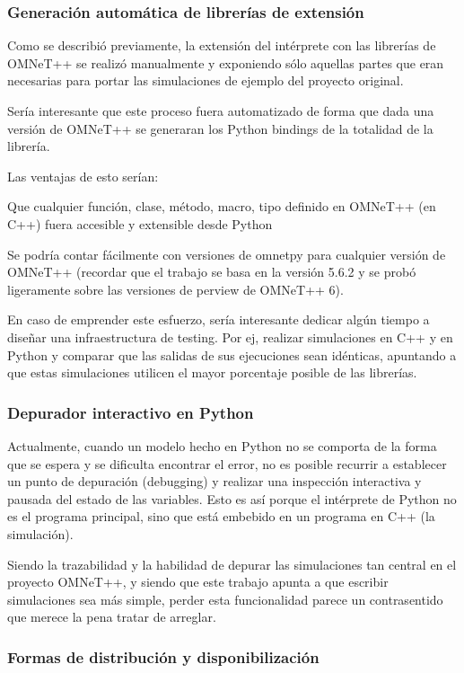 \documentclass[]{article}
\begin{document}
\subsubsection{Generación automática de librerías de extensión}

Como se describió previamente, la extensión del intérprete con las librerías de
OMNeT++ se realizó manualmente y exponiendo sólo aquellas partes que eran
necesarias para portar las simulaciones de ejemplo del proyecto original.

Sería interesante que este proceso fuera automatizado de forma que dada una
versión de OMNeT++ se generaran los Python bindings de la totalidad de la
librería.

Las ventajas de esto serían:

Que cualquier función, clase, método, macro, tipo definido en OMNeT++ (en C++)
fuera accesible y extensible desde Python

Se podría contar fácilmente con versiones de omnetpy para cualquier versión de
OMNeT++ (recordar que el trabajo se basa en la versión 5.6.2 y se probó
ligeramente sobre las versiones de perview de OMNeT++ 6).

En caso de emprender este esfuerzo, sería interesante dedicar algún tiempo a
diseñar una infraestructura de testing. Por ej, realizar simulaciones en C++ y
en Python y comparar que las salidas de sus ejecuciones sean idénticas,
apuntando a que estas simulaciones utilicen el mayor porcentaje posible de las
librerías.

\subsubsection{Depurador interactivo en Python}

Actualmente, cuando un modelo hecho en Python no se comporta de la forma que se
espera y se dificulta encontrar el error, no es posible recurrir a establecer
un punto de depuración (debugging) y realizar una inspección interactiva y
pausada del estado de las variables. Esto es así porque el intérprete de Python
no es el programa principal, sino que está embebido en un programa en C++ (la
simulación).

Siendo la trazabilidad y la habilidad de depurar las simulaciones tan central
en el proyecto OMNeT++, y siendo que este trabajo apunta a que escribir
simulaciones sea más simple, perder esta funcionalidad parece un contrasentido
que merece la pena tratar de arreglar.

\subsubsection{Formas de distribución y disponibilización}
\end{document}
